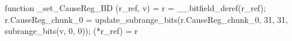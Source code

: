 function _set_CauseReg_BD (r_ref, v) = {
    r = __bitfield_deref(r_ref);
    r.CauseReg_chunk_0 = update_subrange_bits(r.CauseReg_chunk_0, 31, 31, subrange_bits(v, 0, 0));
    (*r_ref) = r
}
